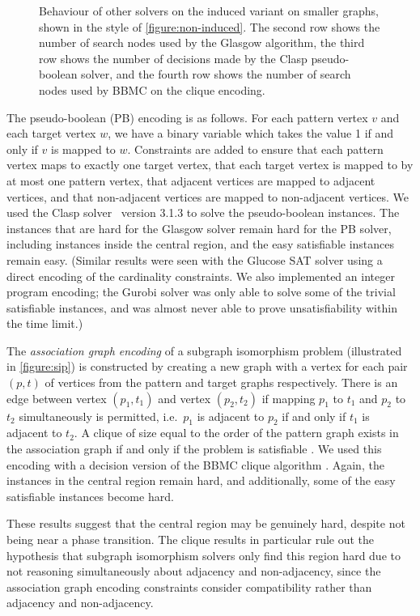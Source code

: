 \documentclass[letterpaper]{article}
\newcommand{\citep}[1]{\cite{#1}}
\begin{document}
\begin{figure*}[t]
    
    \caption{Behaviour of other solvers on the induced variant on smaller graphs, shown in the style of
        \cref{figure:non-induced}. The second row shows the number of search nodes used by the
    Glasgow algorithm, the third row shows the number of decisions made by the Clasp pseudo-boolean
solver, and the fourth row shows the number of search nodes used by BBMC on the clique
encoding.}\label{figure:alt}
\end{figure*}

The pseudo-boolean (PB) encoding is as follows. For each pattern vertex $v$ and each target vertex
$w$, we have a binary variable which takes the value 1 if and only if $v$ is mapped to $w$.
Constraints are added to ensure that each pattern vertex maps to exactly one target vertex, that
each target vertex is mapped to by at most one pattern vertex, that adjacent vertices are mapped to
adjacent vertices, and that non-adjacent vertices are mapped to non-adjacent vertices. We used the
Clasp solver~\citep{gekakaosscsc11a} version 3.1.3 to solve the pseudo-boolean instances.  The
instances that are hard for the Glasgow solver remain hard for the PB solver, including instances
inside the central region, and the easy satisfiable instances remain easy. (Similar results were
seen with the Glucose SAT solver using a direct encoding of the cardinality constraints. We also
implemented an integer program encoding; the Gurobi solver was only able to solve some of the
trivial satisfiable instances, and was almost never able to prove unsatisfiability within the time
limit.)

The \emph{association graph encoding} of a subgraph isomorphism problem (illustrated in
\cref{figure:sip}) is constructed by creating a new graph with a vertex for each pair $(p, t)$ of
vertices from the pattern and target graphs respectively. There is an edge between vertex $(p_1,
t_1)$ and vertex $(p_2, t_2)$ if mapping $p_1$ to $t_1$ and $p_2$ to $t_2$ simultaneously is
permitted, i.e.\ $p_1$ is adjacent to $p_2$ if and only if $t_1$ is adjacent to $t_2$. A clique of
size equal to the order of the pattern graph exists in the association graph if and only if the
problem is satisfiable \citep{Levi:1973}. We used this encoding with a decision version of the BBMC
clique algorithm \citep{SanSegundo:2011}. Again, the instances in the central region remain hard,
and additionally, some of the easy satisfiable instances become hard.

These results suggest that the central region may be genuinely hard, despite not being near a phase
transition. The clique results in particular rule out the hypothesis that subgraph isomorphism
solvers only find this region hard due to not reasoning simultaneously about adjacency and
non-adjacency, since the association graph encoding constraints consider compatibility rather than
adjacency and non-adjacency.
\end{document}
